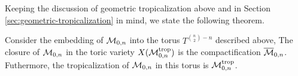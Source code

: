         Keeping the discussion of geometric tropicalization above and in Section \ref{sec:geometric-tropicalization} in mind,
        we state the following theorem.
        \begin{theorem}
            Consider the embedding of $\mathcal{M}_{0, n}$ into the torus $T^{\binom{n}{2} - n}$ described above,
            The closure of $\mathcal{M}_{0, n}$ in the toric variety $X(\mathcal{M}_{0, n}^{\operatorname{trop}})$ is the compactification $\overline{\mathcal{M}}_{0, n}$.
            Futhermore, the tropicalization of $\mathcal{M}_{0, n}$ in this torus is $\mathcal{M}_{0, n}^{\operatorname{trop}}$.
        \end{theorem}
        
        
        
    
     